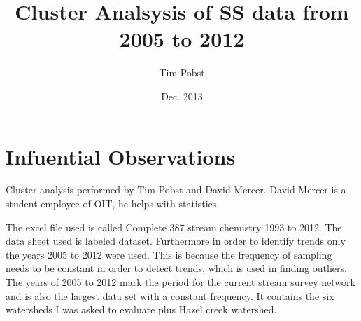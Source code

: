 \documentclass[11pt]{article} %
\title{Cluster Analsysis of SS data from 2005 to 2012}
\author{Tim Pobst}
\date{Dec. 2013} %
\begin{document}
\maketitle

\section{Infuential Observations}

Cluster analysis performed by Tim Pobst and David Mercer.  David Mercer is a student employee of OIT, he helps with statistics.
    
The excel file used is called Complete 387 stream chemistry 1993 to 2012.  The data sheet used is labeled dataset.  Furthermore in order to identify trends only the years 2005 to 2012 were used.  This is because the frequency of sampling needs to be constant in order to detect trends, which is used in finding outliers.  The years of 2005 to 2012 mark the period for the current stream survey network and is also the largest data set with a constant frequency.  It contains the six watersheds I was asked to evaluate plus Hazel creek watershed.
\end{document}
